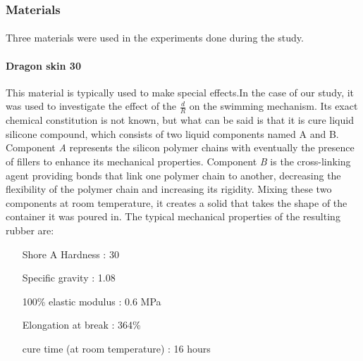 \subsubsection{Materials}
\paragraph{}
Three materials were used in the experiments done during the study.\\ 
\paragraph{Dragon skin 30}
This material is typically used to make special effects.In the case of our study, it was used to investigate the effect of the $\frac{d}{R}$ on the swimming mechanism. Its exact chemical constitution is not known, but what can be said is that it is cure liquid silicone compound, which consists of two liquid components named A and B. Component \emph{A} represents the silicon polymer chains with eventually the presence of fillers to enhance its mechanical properties. Component \emph{B} is the cross-linking agent providing bonds that link one polymer chain to another, decreasing the flexibility of the polymer chain and increasing its rigidity. Mixing these two components at room temperature, it creates a solid that takes the shape of the container it was poured in.
The typical mechanical properties of the resulting rubber are:
\begin{itemize}
	\item[Shore A Hardness]: 30 
	\item[Specific gravity]: 1.08 
	\item[100\% elastic modulus]: 0.6 MPa
	\item[Elongation at break]: 364\%
	\item[cure time (at room temperature)]: 16 hours
\end{itemize}

